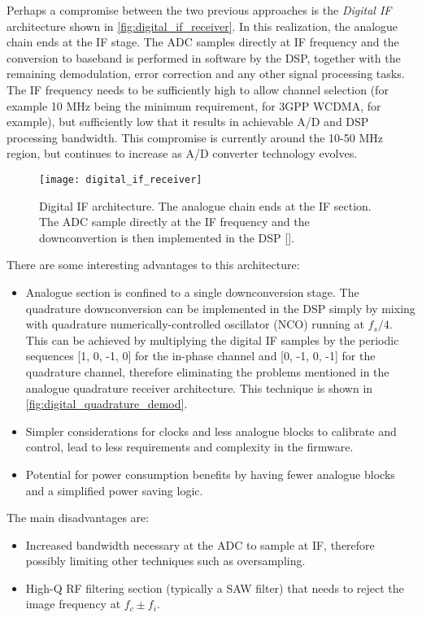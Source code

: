 Perhaps a compromise between the two previous approaches is the \emph{Digital IF } architecture shown in \autoref{fig:digital_if_receiver}. In this realization, the analogue chain ends at the IF stage. The ADC samples directly at IF frequency and the conversion to baseband is performed in software by the DSP, together with the remaining demodulation, error correction and any other signal processing tasks. The IF frequency needs to be sufficiently high to allow channel selection (for example 10 MHz being the minimum requirement, for 3GPP WCDMA, for example), but sufficiently low that it results in achievable A/D and DSP processing bandwidth. This compromise is currently around the 10-50 MHz region, but continues to increase as A/D converter technology evolves.

\begin{figure}[H]
  \centering
  \texttt{[image: digital\_if\_receiver]}
  \caption[Digital IF architecture]{Digital IF architecture. The analogue chain ends at the IF section. The ADC sample directly at the IF frequency and the downconvertion is then implemented in the DSP [\citeauthor{rf_bb_techniques_sdr}].}
  \label{fig:digital_if_receiver}
\end{figure}

There are some interesting advantages to this architecture:
\begin{itemize}
  \item Analogue section is confined to a single downconversion stage. The quadrature downconversion can be implemented in the DSP simply by mixing with quadrature numerically-controlled oscillator (NCO) running at $f_s/4$. This can be achieved by multiplying the digital IF samples by the periodic sequences [1, 0, -1, 0] for the in-phase channel and [0, -1, 0, -1] for the quadrature channel, therefore eliminating the problems mentioned in the analogue quadrature receiver architecture. This technique is shown in \autoref{fig:digital_quadrature_demod}.
  \item Simpler considerations for clocks and less analogue blocks to calibrate and control, lead to less requirements and complexity in the firmware.
  \item Potential for power consumption benefits  by having fewer analogue blocks and a simplified power saving logic.
\end{itemize}

The main disadvantages are:
\begin{itemize}
  \item Increased bandwidth necessary at the ADC to sample at IF, therefore possibly limiting other techniques such as oversampling.
  \item High-Q RF filtering section (typically a SAW filter) that needs to reject the image frequency at $f_c \pm f_i$.
\end{itemize}

